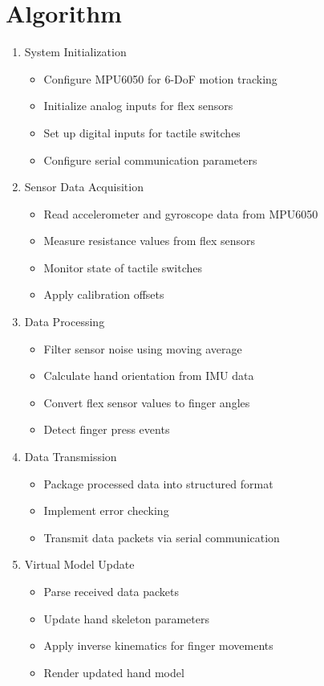 \section{Algorithm}
\begin{enumerate}
    \item System Initialization
    \begin{itemize}
        \item Configure MPU6050 for 6-DoF motion tracking
        \item Initialize analog inputs for flex sensors
        \item Set up digital inputs for tactile switches
        \item Configure serial communication parameters
    \end{itemize}
    \item Sensor Data Acquisition
    \begin{itemize}
        \item Read accelerometer and gyroscope data from MPU6050
        \item Measure resistance values from flex sensors
        \item Monitor state of tactile switches
        \item Apply calibration offsets
    \end{itemize}
    \item Data Processing
    \begin{itemize}
        \item Filter sensor noise using moving average
        \item Calculate hand orientation from IMU data
        \item Convert flex sensor values to finger angles
        \item Detect finger press events
    \end{itemize}
    \item Data Transmission
    \begin{itemize}
        \item Package processed data into structured format
        \item Implement error checking
        \item Transmit data packets via serial communication
    \end{itemize}
    \item Virtual Model Update
    \begin{itemize}
        \item Parse received data packets
        \item Update hand skeleton parameters
        \item Apply inverse kinematics for finger movements
        \item Render updated hand model
    \end{itemize}
\end{enumerate}



